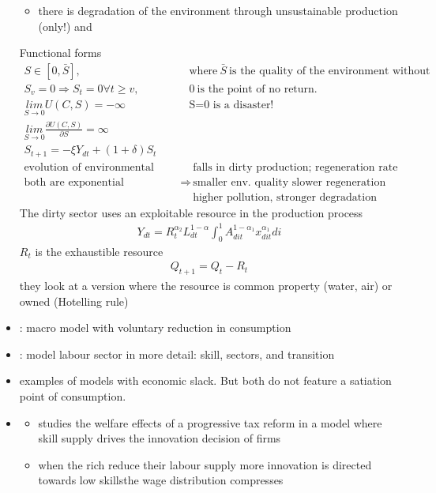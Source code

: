 \begin{itemize}
\begin{itemize}
\item there is degradation of the environment through unsustainable production (only!) and 
\end{itemize}
Functional forms
\begin{align*}
S\in[0,\bar{S}],\ & \text{where}\ \bar{S}\ \text{is the quality of the environment without pollution;}\\
S_v=0 \Rightarrow S_t=0 \forall t\geq v,\ &  0 \ \text{is the point of no return.}\\
\underset{S\rightarrow0}{lim} U(C,S)=-\infty\ & \text{S=0 is a disaster!}\\
\underset{S\rightarrow0}{lim}\frac{\partial U(C,S)}{\partial S}=\infty\ &\\
S_{t+1}= -\xi Y_{dt}+(1+\delta)S_t& \\ 
\text{evolution of environmental quality:} & \text{ falls in dirty production; regeneration rate }\\
 \text{both are exponential relationships}\Rightarrow&\text{ smaller env. quality slower regeneration}\\ 
 &\text{ higher pollution, stronger degradation}
\end{align*}
The dirty sector uses an exploitable resource in the production process
\begin{align*}
Y_{dt}= R_t^{\alpha_2}L_{dt}^{1-\alpha}\int_{0}^{1}A_{dit}^{1-\alpha_1}x_{dit}^{\alpha_1}di
\end{align*}
$R_t$ is the exhaustible resource
\begin{align*}
Q_{t+1}=Q_t-R_t
\end{align*}
they look at a version where the resource is common property (water, air) or owned (Hotelling rule)
\item \cite{Heikkinen2015DegrowthConsumers}: macro model with voluntary reduction in consumption
\item \cite{Borissov2019CarbonDevelopment}: model labour sector in more detail: skill, sectors, and transition
\item \cite{Michaillat2015AggregateUnemployment, Auerbach2021InequalityEconomy} examples of models with economic slack. But both do not feature a satiation point of consumption. 
\item 
\cite{Loebbing2019NationalChange}
\begin{itemize}
	\item studies the welfare effects of a progressive tax reform in a model where skill supply drives the innovation decision of firms
	\item when the rich reduce their labour supply more \ar innovation is directed towards low skills\ar the wage distribution compresses

\end{itemize}
\end{itemize}

